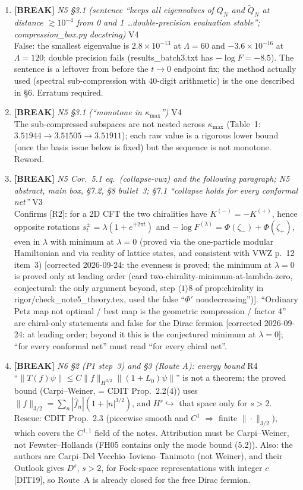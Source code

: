 \documentclass[11pt]{article}
\begin{document}
\begin{enumerate}[leftmargin=1.6em,itemsep=6pt]
\item \textbf{[BREAK]} \emph{N5 \S3.1 (sentence ``keeps all eigenvalues of \(Q_N\) and \(\widetilde Q_N\) at distance \(\gtrsim10^{-4}\) from 0 and 1 \dots double-precision evaluation stable''; compression\_box.py docstring)} \hfill\textsc{V4}\\ False: the smallest eigenvalue is \(2.8\times10^{-13}\) at \(\Lambda=60\) and \(-3.6\times10^{-16}\) at \(\Lambda=120\); double precision fails (results\_batch3.txt has \(-\log F=-8.5\)). The sentence is a leftover from before the \(t\to0\) endpoint fix; the method actually used (spectral sub-compression with 40-digit arithmetic) is the one described in \S6. Erratum required.
\item \textbf{[BREAK]} \emph{N5 \S3.1 (``monotone in \(\kappa_{\max}\)'')} \hfill\textsc{V4}\\ The sub-compressed subspaces are not nested across \(\kappa_{\max}\) (Table~1: \(3.51944\to3.51505\to3.51911\)); each raw value is a rigorous lower bound (once the basis issue below is fixed) but the sequence is not monotone. Reword.
\item \textbf{[BREAK]} \emph{N5 Cor.~5.1 eq.\ (collapse-vwz) and the following paragraph; N5 abstract, main box, \S7.2, \S8 bullet~3; \S7.1 ``collapse holds for every conformal net''} \hfill\textsc{V3}\\ Confirms [R2]: for a 2D CFT the two chiralities have \(K^{(-)}=-K^{(+)}\), hence opposite rotations \(s_t^{\pm}=\lambda(1+e^{\mp2\pi t})\) and \(-\log F^{(\lambda)}=\Phi(\zeta_-)+\Phi(\zeta_+)\), even in \(\lambda\) with minimum at \(\lambda=0\) (proved via the one-particle modular Hamiltonian and via reality of lattice states, and consistent with VWZ p.~12 item~3) [corrected 2026-09-24: the evenness is proved; the minimum at \(\lambda=0\) is proved only at leading order (card two-chirality-minimum-at-lambda-zero, conjectural: the only argument beyond, step \(\langle1\rangle8\) of prop:chirality in rigor/check\_note5\_theory.tex, used the false ``\(\Phi'\) nondecreasing'')]. ``Ordinary Petz map not optimal / best map is the geometric compression / factor 4'' are chiral-only statements and false for the Dirac fermion [corrected 2026-09-24: at leading order; beyond it this is the conjectured minimum at \(\lambda=0\)]; ``for every conformal net'' must read ``for every chiral net''.
\item \textbf{[BREAK]} \emph{N6 \S2 (P1 step~3) and \S3 (Route A): energy bound} \hfill\textsc{R4}\\ ``\(\|T(f)\psi\|\le C\|f\|_{H^{3/2}}\|(1+L_0)\psi\|\)'' is not a theorem; the proved bound (Carpi--Weiner, = CDIT Prop.~2.2(4)) uses \(\|f\|_{3/2}=\sum_n|\hat f_n|(1+|n|^{3/2})\), and \(H^s\hookrightarrow\) that space only for \(s>2\). Rescue: CDIT Prop.~2.3 (piecewise smooth and \(C^1\) \(\Rightarrow\) finite \(\|\cdot\|_{3/2}\)), which covers the \(C^{1,1}\) field of the notes. Attribution must be Carpi--Weiner, not Fewster--Hollands (FH05 contains only the mode bound (5.2)). Also: the authors are Carpi--Del Vecchio--Iovieno--Tanimoto (not Weiner), and their Outlook gives \(D^s\), \(s>2\), for Fock-space representations with integer \(c\) [DIT19], so Route~A is already closed for the free Dirac fermion.

\end{enumerate}
\end{document}
